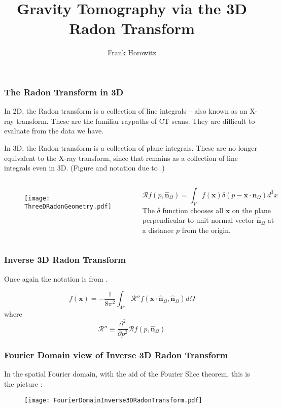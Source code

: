 \documentclass[aspectratio=43,serif,9pt]{beamer}
\title[Gravitational Tomography]{Gravity Tomography via the 3D Radon Transform } %
\author{Frank Horowitz} %
\institute[INSTOC/Cornell] %
{
INSTOC, Cornell University\\ %
\medskip
\textit{frank@horow.net} %
}
\date{} %
\newcommand{\Rad}{\mathcal{R}}
\newcommand{\vect}[1]{\boldsymbol{#1}}
\begin{document}
\begin{frame}
  \titlepage %

\end{frame}

\begin{frame}
  \frametitle{The Radon Transform in 3D}
  In 2D, the Radon transform is a collection of line integrals -- also known as an X-ray transform. These are the familiar raypaths of CT scans. They are difficult to evaluate from the data we have.

  In 3D, the Radon transform is a collection of plane integrals. These are no longer equivalent to the X-ray transform, since that remains as a collection of line integrals even in 3D. (Figure and notation due to \cite{Bortfeld13}.)
\begin{columns}
  \begin{figure}
    \texttt{[image: ThreeDRadonGeometry.pdf]}
  \end{figure}
  \[ \Rad f(p,\hat{\vect{n}}_\Omega) = \int_V f(\vect{x}) \delta(p - \vect{x}\cdot\hat{\vect{n}}_\Omega) d^3x
  \]
  The $\delta$ function chooses all $\vect{x}$ on the plane perpendicular to unit normal vector $\hat{\vect{n}}_\Omega$ at a distance $p$ from the origin.
\end{columns}
\end{frame}

\begin{frame}
  \frametitle{Inverse 3D Radon Transform}

  Once again the notation is from \cite{Bortfeld13}.

  \[
    f(\vect{x}) = - \frac{1}{8 \pi^2} \int_{4 \pi} \Rad'' f(\vect{x}\cdot\hat{\vect{n}}_\Omega,\hat{\vect{n}}_\Omega) d\Omega
  \]
  where
  \[
    \Rad'' \equiv \frac{\partial^2  }{\partial p^2} \Rad f(p,\hat{\vect{n}}_\Omega)
  \]

\end{frame}

\begin{frame}
  \frametitle{Fourier Domain view of Inverse 3D Radon Transform}
  In the spatial Fourier domain, with the aid of the Fourier Slice theorem, this is the picture \parencite[image is again due to][]{Bortfeld13}:
  \begin{figure}
    \texttt{[image: FourierDomainInverse3DRadonTransform.pdf]}
  \end{figure}
\end{frame}
\end{document}
